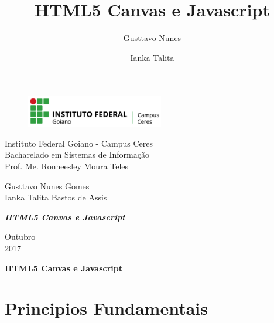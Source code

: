 \documentclass[12pt,a4paper]{article}
\title{ HTML5 Canvas e Javascript}
\author{  Gusttavo Nunes \and Ianka Talita }
\begin{document}
\begin{titlepage}


\begin{center}
\begin{figure}[htb]
		
		\label{figura:LogoIF}
	
		\centering
		\includegraphics[width=6cm]{recursos/imagens/logo.png} 
\end{figure}


Instituto Federal Goiano - Campus Ceres\\
Bacharelado em Sistemas de Informação\\
Prof. Me. Ronneesley Moura Teles\\\vspace{0.5cm}


Gusttavo Nunes Gomes\\
Ianka Talita Bastos de Assis\\




\vspace{5.0cm}

\textit{\textbf{\Large{ HTML5 Canvas e Javascript}}}\\\vspace{0.5cm}
\vspace{9.5cm}

Outubro\\
2017\\
\end{center}
\end{titlepage}



\tableofcontents

\newpage
\begin{center}
\textbf{\Large{HTML5 Canvas e Javascript}}\\\vspace{0.5cm}
\end{center}

\section{Principios Fundamentais}
\end{document}

